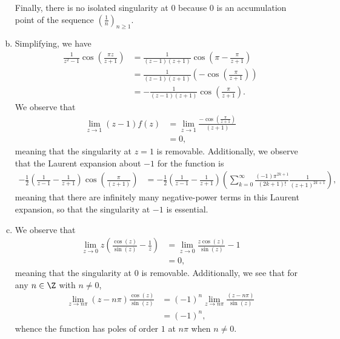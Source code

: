 \documentclass[10pt]{mypackage}
\begin{document}
\begin{solution}
\begin{enumerate}[(a)]
      Finally, there is no isolated singularity at $0$ because $0$ is an accumulation point of the sequence $\left( \frac{1}{n} \right)_{n\geq 1}$.
    \item Simplifying, we have
      \begin{align*}
        \frac{1}{z^2 - 1} \cos\left( \frac{\pi z}{z+1} \right) &= \frac{1}{\left( z-1 \right)\left( z+1 \right)} \cos\left( \pi - \frac{\pi}{z+1} \right)\\
                                                               &= \frac{1}{\left( z-1 \right)\left( z+1 \right)} \left( -\cos\left( \frac{\pi}{z+1} \right) \right)\\
                                                               &= -\frac{1}{\left( z-1 \right)\left( z+1 \right)} \cos\left( \frac{\pi}{z+1} \right).
      \end{align*}
      We observe that
      \begin{align*}
        \lim_{z\rightarrow 1} \left( z-1 \right)f(z) &= \lim_{z\rightarrow 1}\frac{-\cos\left( \frac{\pi}{z+1} \right)}{\left( z+1 \right)}\\
                                                     &= 0,
      \end{align*}
      meaning that the singularity at $z = 1$ is removable. Additionally, we observe that the Laurent expansion about $-1$ for the function is
      \begin{align*}
        -\frac{1}{2}\left( \frac{1}{z-1} - \frac{1}{z+1} \right)\cos\left( \frac{\pi}{\left( z+1 \right)} \right) &= -\frac{1}{2} \left( \frac{1}{z-1} - \frac{1}{z+1} \right) \left( \sum_{k=0}^{\infty}\frac{\left( -1 \right)\pi^{2k+1}}{\left( 2k+1 \right)!}\frac{1}{\left( z+1 \right)^{2k+1}} \right),
      \end{align*}
      meaning that there are infinitely many negative-power terms in this Laurent expansion, so that the singularity at $-1$ is essential.
    \item We observe that
      \begin{align*}
        \lim_{z\rightarrow 0} z\left( \frac{\cos(z)}{\sin(z)} - \frac{1}{z} \right) &= \lim_{z\rightarrow 0} \frac{z\cos\left( z \right)}{\sin\left( z \right)} - 1\\
                                                                                    &= 0,
      \end{align*}
      meaning that the singularity at $0$ is removable. Additionally, we see that for any $n\in\Z$ with $n\neq 0$,
      \begin{align*}
        \lim_{z\rightarrow n\pi}\left( z-n\pi \right)\frac{\cos\left( z \right)}{\sin\left( z \right)} &= \left( -1 \right)^{n} \lim_{z\rightarrow n\pi} \frac{\left( z-n\pi \right)}{\sin\left( z \right)}\\
                                                                                                       &= \left( -1 \right)^{n},
      \end{align*}
      whence the function has poles of order $1$ at $n\pi$ when $n\neq 0$.
  \end{enumerate}
\end{solution}
\end{document}
